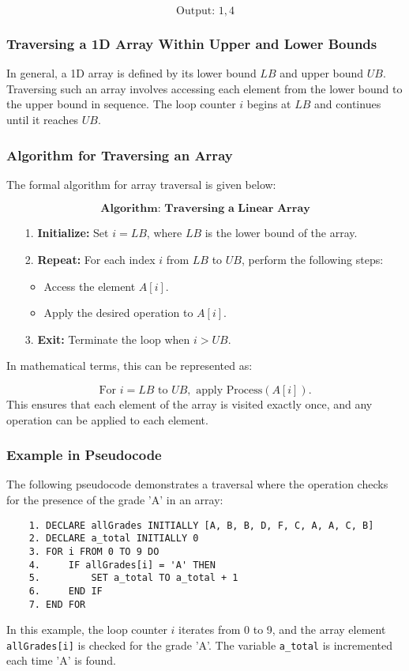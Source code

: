 \documentclass[12pt, oneside]{book}
\begin{document}
\[
\text{Output: } 1, 4
\]

\subsubsection{Traversing a 1D Array Within Upper and Lower Bounds}
In general, a 1D array is defined by its lower bound \( LB \) and upper bound \( UB \). Traversing such an array involves accessing each element from the lower bound to the upper bound in sequence. The loop counter \( i \) begins at \( LB \) and continues until it reaches \( UB \).

\subsubsection{Algorithm for Traversing an Array}
The formal algorithm for array traversal is given below:

\[
\textbf{Algorithm: Traversing a Linear Array}
\]
\begin{itemize}
	\item[1.] \textbf{Initialize:} Set \( i = LB \), where \( LB \) is the lower bound of the array.
	\item[2.] \textbf{Repeat:} For each index \( i \) from \( LB \) to \( UB \), perform the following steps:
	\begin{itemize}
		\item Access the element \( A[i] \).
		\item Apply the desired operation to \( A[i] \).
	\end{itemize}
	\item[3.] \textbf{Exit:} Terminate the loop when \( i > UB \).
\end{itemize}
In mathematical terms, this can be represented as:

\[
\text{For } i = LB \text{ to } UB, \text{ apply } \text{Process}(A[i]).
\]
This ensures that each element of the array is visited exactly once, and any operation can be applied to each element.

\subsubsection{ Example in Pseudocode}

The following pseudocode demonstrates a traversal where the operation checks for the presence of the grade 'A' in an array:

\begin{verbatim}
	1. DECLARE allGrades INITIALLY [A, B, B, D, F, C, A, A, C, B]
	2. DECLARE a_total INITIALLY 0
	3. FOR i FROM 0 TO 9 DO
	4.     IF allGrades[i] = 'A' THEN
	5.         SET a_total TO a_total + 1
	6.     END IF
	7. END FOR
\end{verbatim}
In this example, the loop counter \( i \) iterates from 0 to 9, and the array element \texttt{allGrades[i]} is checked for the grade 'A'. The variable \texttt{a\_total} is incremented each time 'A' is found.
\end{document}
